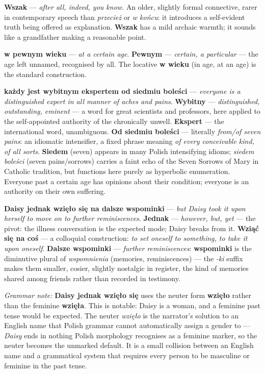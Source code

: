 \textbf{Wszak} --- \textit{after all, indeed, you
know}. An older, slightly formal connective, rarer
in contemporary speech than \textit{przecież} or
\textit{w końcu}: it introduces a self-evident truth
being offered as explanation. \textbf{Wszak} has a
mild archaic warmth; it sounds like a grandfather
making a reasonable point.

\textbf{w pewnym wieku} --- \textit{at a certain age}.
\textbf{Pewnym} --- \textit{certain, a particular} ---
the age left unnamed, recognised by all. The locative
\textbf{w wieku} (in age, at an age) is the standard
construction.

\textbf{każdy jest wybitnym ekspertem od siedmiu
boleści} --- \textit{everyone is a distinguished expert
in all manner of aches and pains}. \textbf{Wybitny}
--- \textit{distinguished, outstanding, eminent} ---
a word for great scientists and professors, here
applied to the self-appointed authority of the
chronically unwell. \textbf{Ekspert} --- the
international word, unambiguous. \textbf{Od siedmiu
boleści} --- literally \textit{from/of seven pains}:
an idiomatic intensifier, a fixed phrase meaning
\textit{of every conceivable kind, of all sorts}.
\textbf{Siedem} (seven) appears in many Polish
intensifying idioms; \textit{siedem boleści}
(seven pains/sorrows) carries a faint echo of the
Seven Sorrows of Mary in Catholic tradition, but
functions here purely as hyperbolic enumeration.
Everyone past a certain age has opinions about their
condition; everyone is an authority on their own
suffering.

\textbf{Daisy jednak wzięło się na dalsze wspominki}
--- \textit{but Daisy took it upon herself to move on
to further reminiscences}. \textbf{Jednak} ---
\textit{however, but, yet} --- the pivot: the illness
conversation is the expected mode; Daisy breaks from
it. \textbf{Wziąć się na coś} --- a colloquial
construction: \textit{to set oneself to something,
to take it upon oneself}. \textbf{Dalsze wspominki}
--- \textit{further reminiscences}: \textbf{wspominki}
is the diminutive plural of \textit{wspomnienia}
(memories, reminiscences) --- the \textit{-ki} suffix
makes them smaller, cosier, slightly nostalgic in
register, the kind of memories shared among friends
rather than recorded in testimony.

\medskip
\noindent\textit{Grammar note:} \textbf{Daisy jednak
wzięło się} uses the neuter form \textbf{wzięło}
rather than the feminine \textbf{wzięła}. This is
notable: Daisy is a woman, and a feminine past tense
would be expected. The neuter \textit{wzięło} is
the narrator's solution to an English name that
Polish grammar cannot automatically assign a gender
to --- \textit{Daisy} ends in nothing Polish
morphology recognises as a feminine marker, so the
neuter becomes the unmarked default. It is a small
collision between an English name and a grammatical
system that requires every person to be
masculine or feminine in the past tense.

